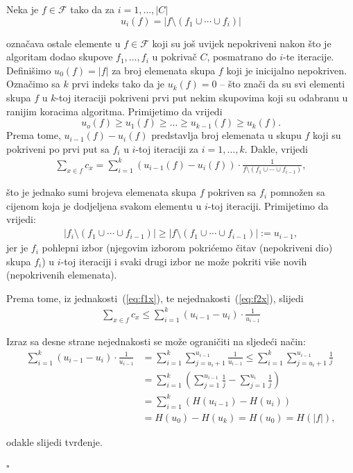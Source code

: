 \documentclass[a4paper, utf8, 11pt, colorlinks]{book}
\newenvironment{proof}{{Dokaz:}}{\hfill$\square$}
\begin{document}
\begin{proof}
	 Neka je $f\in \mathcal{F}$ tako da za $i=1,\ldots,|C|$
	 $$u_i(f) = |f \setminus (f_1 \cup \cdots \cup f_{i} )|$$
	 
	 označava ostale elemente u $f \in \mathcal{F}$ koji su još uvijek nepokriveni nakon što je algoritam dodao skupove $f_1,\ldots, f_i$ u pokrivač $C$, posmatrano do $i$-te iteracije. Definišimo $u_0(f)=|f|$ za broj elemenata skupa $f$ koji je inicijalno nepokriven. 
	 Označimo sa $k$ prvi indeks tako da je $u_k(f)=0$  -- što znači da su svi elementi skupa $f$ u $k$-toj iteraciji
	 pokriveni prvi put nekim skupovima %
	 koji su odabranu u ranijim koracima algoritma. Primijetimo da vrijedi
	 $$ u_o(f) \geq u_1(f) \geq \ldots \geq u_{k-1}(f) \geq u_k(f).$$
	 Prema tome, $u_{i-1}(f) - u_{i}(f)$ predstavlja broj elemenata u skupu $f$ koji su pokriveni 
	 po prvi put sa $f_i$ u $i$-toj iteraciji za $i=1,\ldots,k$. Dakle, vrijedi
	 \begin{align}\label{eq:q1}
	 	\sum_{x \in f} c_x = \sum_{i=1}^k( u_{i-1}(f) - u_{i}(f)) \cdot \frac{1}{ f \setminus ( f_1 \cup \cdots \cup f_{i-1})},
	 \end{align}
 
   \noindent što je jednako sumi brojeva elemenata skupa $f$ pokriven sa $f_i$ pomnožen sa cijenom koja je dodjeljena svakom elementu u $i$-toj iteraciji. Primijetimo da vrijedi:
 \begin{align}\label{eq:q2x}
 	|f_i \setminus (f_1 \cup \cdots \cup f_{i-1})| \geq | f   \setminus (f_1 \cup \cdots \cup f_{i-1}) | := u_{i-1},
 \end{align}
 jer je $f_i$ pohlepni izbor (njegovim izborom pokrićemo čitav (nepokriveni dio) skupa $f_i$) u $i$-toj iteraciji i svaki drugi izbor ne može pokriti više novih (nepokrivenih elemenata). 
 
 Prema tome, iz jednakosti~(\ref{eq:f1x}), te nejednakosti~(\ref{eq:f2x}), slijedi 
 \begin{align*}
 	\sum_{x \in f} c_x \leq \sum_{i=1}^k ( u_{i-1} - u_{i}) \cdot \frac{1}{u_{i-1}}
 \end{align*}
 
 Izraz sa desne strane nejednakosti se može ograničiti na sljedeći način:
   \begin{align*}
 	   \sum_{i=1}^k ( u_{i-1} - u_{i}) \cdot \frac{1}{u_{i-1}} &= \sum_{i=1}^k \sum_{j=u_i + 1}^{u_{i-1}} \frac{1}{u_{i-1}} \leq \sum_{i=1}^k \sum_{j=u_i + 1}^{u_{i-1}}\frac{1}{j} \\
 	   &= \sum_{i=1}^k \left( \sum_{j=1}^{u_{i-1}}\frac{1}{j} - \sum_{j=1}^{u_{i}}\frac{1}{j} \right) \\
 	   &= \sum_{i=1}^k (H(u_{i-1}) - H(u_i)) \\
    	&= H(u_0) - H(u_k) = H(u_0) = H(|f|),
 \end{align*}
 
 odakle slijedi tvrđenje. 
 
\end{proof}
\end{document}
